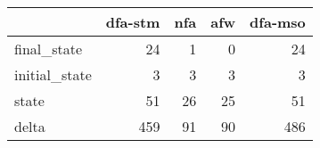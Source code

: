 \begin{tabular}{lrrrr}
\toprule
{} &  dfa-stm &  nfa &  afw &  dfa-mso \\
\midrule
final\_state   &       24 &    1 &    0 &       24 \\
initial\_state &        3 &    3 &    3 &        3 \\
state         &       51 &   26 &   25 &       51 \\
delta         &      459 &   91 &   90 &      486 \\
\bottomrule
\end{tabular}
